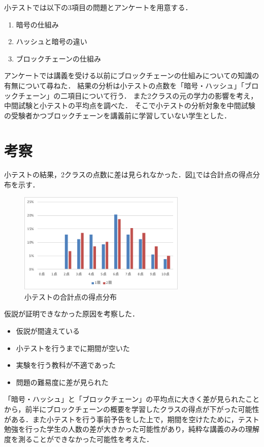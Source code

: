 \documentclass[twocolumn,10pt,a4j]{jsarticle}
\begin{document}
小テストでは以下の3項目の問題とアンケートを用意する．
\begin{enumerate}
\renewcommand {\labelenumi}{(\arabic{enumi})}
\item 暗号の仕組み
\item ハッシュと暗号の違い
\item ブロックチェーンの仕組み
\end{enumerate}

アンケートでは講義を受ける以前にブロックチェーンの仕組みについての知識の有無について尋ねた．
結果の分析は小テストの点数を「暗号・ハッシュ」「ブロックチェーン」の二項目について行う．
また2クラスの元の学力の影響を考え，中間試験と小テストの平均点を調べた．
そこで小テストの分析対象を中間試験の受験者かつブロックチェーンを講義前に学習していない学生とした．


\section{考察}

小テストの結果，2クラスの点数に差は見られなかった．図\ref{fig:total}では合計点の得点分布を示す．

\begin{figure}[H]
\centering
\includegraphics[width=8cm]{total.pdf}
\caption{小テストの合計点の得点分布}
\label{fig:total}
\end{figure}

仮説が証明できなかった原因を考察した．
\begin{itemize}
\item 仮説が間違えている
\item 小テストを行うまでに期間が空いた
\item 実験を行う教科が不適であった
\item 問題の難易度に差が見られた
\end{itemize}

「暗号・ハッシュ」と「ブロックチェーン」の平均点に大きく差が見られたことから，前半にブロックチェーンの概要を学習したクラスの得点が下がった可能性がある．また小テストを行う事前予告をした上で，期間を空けたために，テスト勉強を行った学生の人数の差が大きかった可能性があり，純粋な講義のみの理解度を測ることができなかった可能性を考えた．
\end{document}
